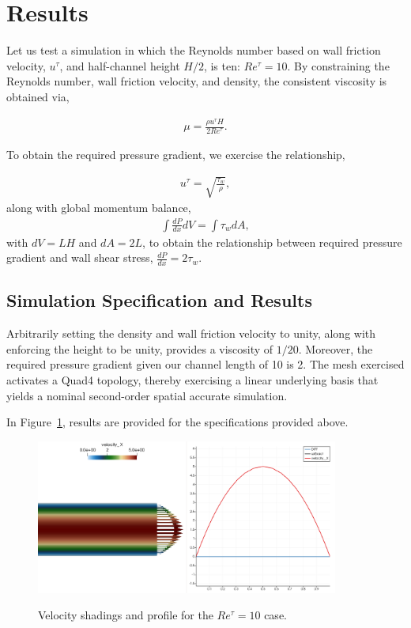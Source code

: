 \documentclass{article}
\begin{document}
\section{Results}
Let us test a simulation in which the Reynolds number based on wall friction
velocity, $u^\tau$, and half-channel height $H/2$, is ten: $Re^\tau = 10$.
By constraining the Reynolds number, wall friction velocity, and density, 
the consistent viscosity is obtained via,

\begin{align}
  \mu = \frac{\rho u^\tau H}{2 Re^\tau}.
\label{eq:muForm}
\end{align}

To obtain the required pressure gradient, we exercise the relationship,

\begin{align}
  u^\tau = \sqrt{\frac{\tau_w}{\rho}},
\label{eq:tauWall}
\end{align}
along with global momentum balance,
%
\begin{align}
\int \frac{dP}{dx} dV = \int \tau_w dA,
\label{eq:balance}
\end{align}
with $dV = LH$ and $dA = 2L$, to obtain the relationship between
required pressure gradient and wall shear stress, $\frac{dP}{dx} = 2\tau_w$.

\subsection{Simulation Specification and Results}

Arbitrarily setting the density and wall friction velocity to unity, 
along with enforcing the height to be unity, provides a viscosity of $1/20$.
Moreover, the required pressure gradient given our channel length of 10 is
2. The mesh exercised activates a Quad4 topology, thereby exercising a
linear underlying basis that yields a nominal second-order spatial accurate
simulation.

In Figure~\ref{fig:results}, results are provided for the specifications
provided above.

\begin{figure}[!htbp]
  \centering
  {
   \includegraphics[height=2.0in]{images/2d_quad4_channel_results.png}
  }
  \caption{Velocity shadings and profile for the $Re^\tau = 10$ case.}
  \label{fig:results}
\end{figure}
\end{document}
